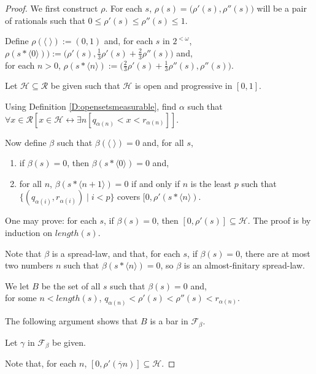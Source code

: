 \documentclass[a4paper]{amsart}
\theoremstyle{plain}
\begin{document}
\begin{proof} We first construct $\rho$. For each $s$, $\rho(s)=\bigl(\rho'(s), \rho''(s)\bigr)$ will be a pair of rationals such that $0\le \rho'(s)\le\rho''(s)\le 1$.

Define $\rho(\langle\;\rangle):= (0,1)$ and, for each $s$ in $2^{<\omega}$, \\$\rho(s\ast \langle 0 \rangle)):= \bigl(\rho'(s), \frac{1}{3}\rho'(s) + \frac{2}{3}\rho''(s)\bigr)$ and, \\for each $n>0$,  $\rho(s\ast\langle n \rangle):=\bigl(\frac{2}{3}\rho'(s) +\frac{1}{3}\rho''(s), \rho''(s)\bigr)$.

Let $\mathcal{H}\subseteq \mathcal{R}$ be given such that $\mathcal{H}$ is open and progressive in $[0,1]$.

Using Definition \ref{D:opensetsmeasurable}, find $\alpha$ such that $\forall x \in \mathcal{R}[x\in \mathcal{H}\leftrightarrow \exists n[q_{\alpha(n)}<x<r_{\alpha(n)}]]$. 

Now define $\beta$ such that $\beta(\langle\;\rangle)=0$ and, for all $s$, \begin{enumerate}[\upshape (1)] \item if $\beta(s)=0$, then $\beta(s\ast\langle 0 \rangle)=0$ and, \item for all $ n$, $\beta(s\ast\langle n+1 \rangle) =0$ if and only if $n$ is  the least $p$ such that \\$\{(q_{\alpha(i)}, r_{\alpha(i)})\mid i<p\}$ covers $[0, \rho'(s\ast\langle n \rangle)$. \end{enumerate}

One may prove: for each $s$, if $\beta(s)=0$, then $[0, \rho'(s)]\subseteq \mathcal{H}$. The proof is by induction on $length(s)$. 

Note that $\beta$ is a spread-law, and that, for each $s$, if $\beta(s)=0$, there are at most two numbers $n$ such that $\beta(s\ast\langle n \rangle)=0$, so $\beta$ is an almost-finitary spread-law.

We let $B$ be the set of all $s$ such that $\beta(s)=0$ and,\\ for some $n<length(s)$, $q_{\alpha(n)} < \rho'(s) <\rho''(s) < r_{\alpha(n)}$.

The following argument shows that $B$ is a bar in $\mathcal{F}_\beta$. 

Let $\gamma$ in $\mathcal{F}_\beta$ be given.

Note that, for each $n$, $[0, \rho'(\overline \gamma n)]\subseteq \mathcal{H}$.


\end{proof}
\end{document}
